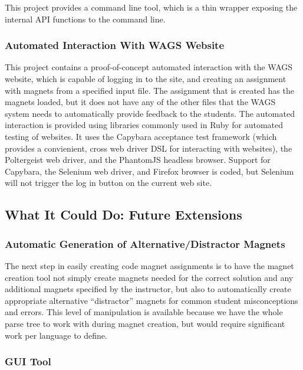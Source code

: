 \documentclass[letter,10pt]{article}
\begin{document}
This project provides a command line tool, which is a thin wrapper 
exposing the internal API functions to the command line.


\subsubsection{Automated Interaction With WAGS Website}

This project contains a proof-of-concept automated interaction with the 
WAGS website, which is capable of logging in to the site, and creating 
an assignment with magnets from a specified input file. The assignment 
that is created has the magnets loaded, but it does not have any of the 
other files that the WAGS system needs to automatically provide 
feedback to the students. The automated interaction is provided using 
libraries commonly used in Ruby for automated testing of websites. It 
uses the Capybara acceptance test framework (which provides a 
convienient, cross web driver DSL for interacting with websites), the 
Poltergeist web driver, and the PhantomJS headless browser. Support for 
Capybara, the Selenium web driver, and Firefox browser is coded, but 
Selenium will not trigger the log in button on the current web site.


\subsection{What It Could Do: Future Extensions}

\subsubsection{Automatic Generation of Alternative/Distractor Magnets}

The next step in easily creating code magnet assignments is to have the 
magnet creation tool not simply create magnets needed for the correct 
solution and any additional magnets specified by the instructor, but 
also to automatically create appropriate alternative ``distractor'' 
magnets for common student misconceptions and errors. This level of 
manipulation is available because we have the whole parse tree to work 
with during magnet creation, but would require significant work per 
language to define.

\subsubsection{GUI Tool}
\end{document}
